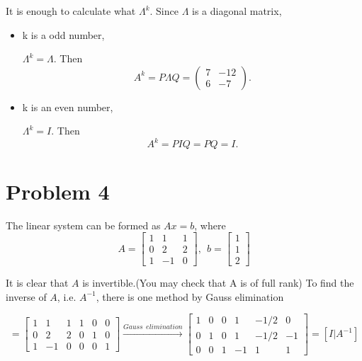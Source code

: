 \documentclass[12pt]{article}
\begin{document}
It is enough to calculate what $\Lambda^k$. Since $\Lambda$ is a diagonal matrix, 
\begin{itemize}
\item k is a odd number, 

$\Lambda ^k = \Lambda$. Then 
\begin{equation*}
A^k = P\Lambda Q = \begin{pmatrix}
7 & -12 \\
6 & -7
\end{pmatrix}.
\end{equation*}
\item k is an even number, 

$\Lambda ^k = I$. Then 
\begin{equation*}
A^k = PIQ = PQ = I.
\end{equation*}

\end{itemize}

\section{Problem 4}

The linear system can be formed as $Ax = b$, where
\begin{equation*}
A = \begin{bmatrix}
1 & 1 & 1\\
0 & 2 & 2\\
1 & -1 & 0
\end{bmatrix}, \ \ 
b = \begin{bmatrix}
1 \\
1 \\
2
\end{bmatrix}
\end{equation*}

It is clear that $A$ is invertible.(You may check that A is of full rank)
To find the inverse of $A$, i.e. $A^{-1}$, there is one method by Gauss elimination

\begin{equation*}
[A|I] = \begin{bmatrix}
1 & 1 & 1 & 1 & 0 & 0 \\
0 & 2 & 2 & 0 & 1 & 0 \\
1 & -1 & 0 & 0 & 0 & 1
\end{bmatrix} \xrightarrow {Gauss \ \ elimination}
\begin{bmatrix}
1 & 0 & 0 & 1 & -1/2 & 0 \\
0 & 1 & 0 & 1 & -1/2 & -1 \\
0 & 0 & 1 & -1 & 1 & 1 
\end{bmatrix} = [I|A^{-1}]
\end{equation*}
\end{document}
